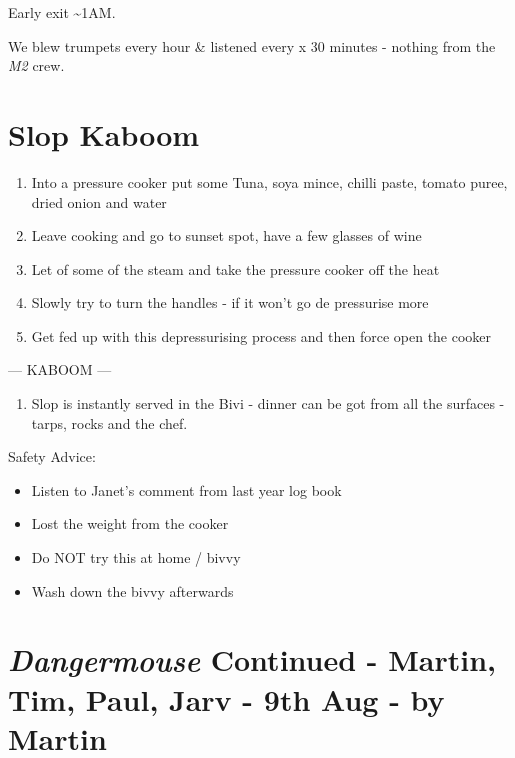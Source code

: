 Early exit \textasciitilde1AM.

We blew trumpets every hour \& listened every x 30 minutes - nothing
from the \emph{M2} crew.


\hypertarget{slop-kaboom}{%
\section{Slop Kaboom}\label{slop-kaboom}}

\begin{enumerate}
\def\labelenumi{\arabic{enumi}.}
\tightlist
\item
  Into a pressure cooker put some Tuna, soya mince, chilli paste, tomato
  puree, dried onion and water
\item
  Leave cooking and go to sunset spot, have a few glasses of wine
\item
  Let of some of the steam and take the pressure cooker off the heat
\item
  Slowly try to turn the handles - if it won't go de pressurise more
\item
  Get fed up with this depressurising process and then force open the
  cooker
\end{enumerate}

--- KABOOM ---

\begin{enumerate}
\def\labelenumi{\arabic{enumi}.}
\setcounter{enumi}{5}
\tightlist
\item
  Slop is instantly served in the Bivi - dinner can be got from all the
  surfaces - tarps, rocks and the chef.
\end{enumerate}

Safety Advice:

\begin{itemize}
\tightlist
\item
  Listen to Janet's comment from last year log book
\item
  Lost the weight from the cooker
\item
  Do NOT try this at home / bivvy
\item
  Wash down the bivvy afterwards
\end{itemize}


\hypertarget{dangermouse-continued---martin-tim-paul-jarv---9th-aug---by-martin}{%
\section{\texorpdfstring{\emph{Dangermouse} Continued - Martin, Tim,
Paul, Jarv - 9th Aug - by
Martin}{Dangermouse Continued - Martin, Tim, Paul, Jarv - 9th Aug - by Martin}}\label{dangermouse-continued---martin-tim-paul-jarv---9th-aug---by-martin}}

